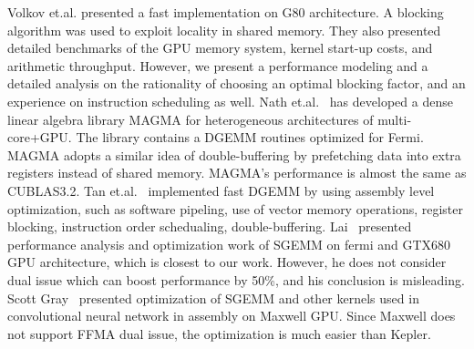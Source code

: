 \documentclass{sig-alternate-05-2015}
\begin{document}
Volkov et.al.\cite{volkov} presented a fast implementation on G80 architecture. A blocking algorithm was used to exploit locality in shared
memory. They also presented detailed benchmarks of the GPU memory system, kernel start-up costs, and arithmetic
throughput. However, we present a performance modeling and a detailed analysis on the rationality of choosing an optimal
blocking factor, and an experience on instruction scheduling as well.
Nath et.al.~\cite{magma} has developed a dense linear algebra library MAGMA for heterogeneous architectures of multi-core+GPU. The library contains a DGEMM routines optimized for Fermi. MAGMA adopts a similar idea of double-buffering by prefetching data into extra registers instead of shared memory. MAGMA’s performance is almost the same as CUBLAS3.2.
Tan et.al.~\cite{tan} implemented fast DGEMM by using assembly level optimization, such as software pipeling, use of
vector memory operations, register blocking, instruction order schedualing, double-buffering.
Lai~\cite{lai} presented performance analysis and optimization work of SGEMM on fermi and GTX680 GPU architecture, which
is closest to our work. However, he does not consider dual issue which can boost performance by 50\%, and his conclusion is misleading.
Scott Gray~\cite{nervana_sgemm_wiki} presented optimization of SGEMM and other kernels used in convolutional neural
network in assembly on Maxwell GPU. Since Maxwell does not support FFMA dual issue, the optimization is much easier than
Kepler.










\end{document}
